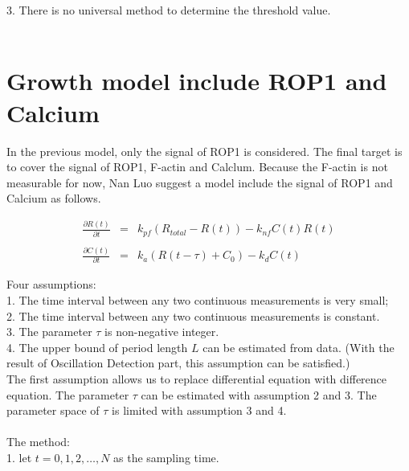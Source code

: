 \documentclass[12pt]{article}
\begin{document}
3. There is no universal method to determine the threshold value. \\ \\

\section{Growth model include ROP1 and Calcium}

In the previous model, only the signal of ROP1 is considered. The final target is to cover the signal of ROP1, F-actin and Calclum. Because the F-actin is not measurable for now, Nan Luo suggest a model include the signal of ROP1 and Calcium as follows.

\begin{equation}
  \begin{array}{rcl}
    \frac{\partial{}R(t)}{\partial{}t} & = & k_{pf}(R_{total} - R(t)) - k_{nf}C(t)R(t) \\
    & & \\
    \frac{\partial{}C(t)}{\partial{}t} & = & k_{a}(R(t - \tau) + C_{0}) - k_{d}C(t)
  \end{array}
\end{equation}

Four assumptions: \\

1. The time interval between any two continuous measurements is very small; \\

2. The time interval between any two continuous measurements is constant. \\

3. The parameter $\tau$ is non-negative integer.\\

4. The upper bound of period length $L$ can be estimated from data. (With the result of Oscillation Detection part, this assumption can be satisfied.)\\

The first assumption allows us to replace differential equation with difference equation. The parameter $\tau$ can be estimated with assumption 2 and 3. The parameter space of $\tau$ is limited with assumption 3 and 4. \\
\\

The method: \\

1. let $t = 0, 1, 2, \ldots , N$ as the sampling time. \\
\end{document}
